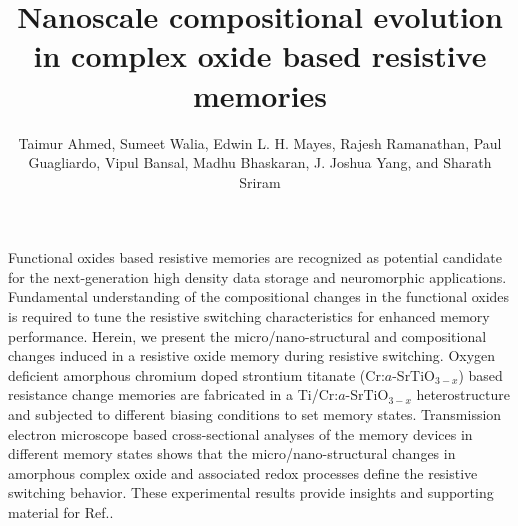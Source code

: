 \documentclass{osa-article}
\begin{document}
\title{Nanoscale compositional evolution in complex oxide based resistive memories}

\author{Taimur Ahmed, Sumeet Walia, Edwin L. H. Mayes, Rajesh Ramanathan, Paul Guagliardo, Vipul Bansal, Madhu Bhaskaran, J. Joshua Yang, and Sharath Sriram}

\address{Functional Materials and Microsystems Research Group and Micro Nano Research Facility, RMIT University, Melbourne, VIC 3001, Australia\\
RMIT Microscopy and Microanalysis Facility, RMIT University, Melbourne, VIC 3001, Australia\\
Ian Potter NanoBioSensing Facility, NanoBiotechnology Research Laboratory, School of Science, RMIT University, Melbourne, VIC 3001, Australia\\
Centre for Microscopy, Characterisation and Analysis, The University of Western Australia, Perth, WA 6009, Australia\\
Department of Electrical and Computer Engineering, University of Massachusetts, Amherst, MA 01003, USA}


\begin{abstract*}
Functional oxides based resistive memories are recognized as potential candidate for the next-generation high density data storage and neuromorphic applications. Fundamental understanding of the compositional changes in the functional oxides is required to tune the resistive switching characteristics for enhanced memory performance. Herein, we present the micro/nano-structural and compositional changes induced in a resistive oxide memory during resistive switching. Oxygen deficient amorphous chromium doped strontium titanate (Cr:$a$-SrTiO$_{3-x}$) based resistance change memories are fabricated in a Ti/Cr:$a$-SrTiO$_{3-x}$ heterostructure and subjected to different biasing conditions to set memory states. Transmission electron microscope based cross-sectional analyses of the memory devices in different memory states shows that the micro/nano-structural changes in amorphous complex oxide and associated redox processes define the resistive switching behavior. These experimental results provide insights and supporting material for Ref.\cite{CrSTO}.
\end{abstract*}
\end{document}
